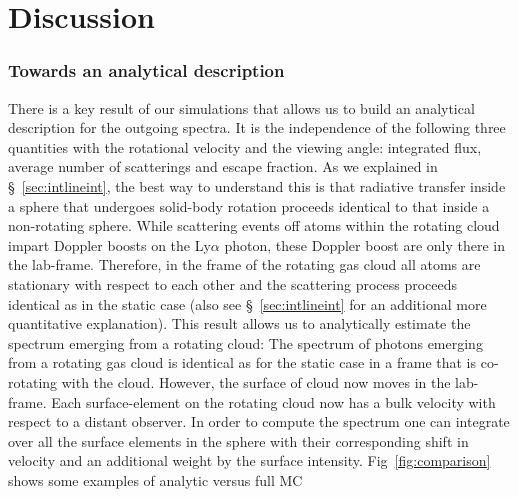 
\chapter{Discussion}

\label{sec:discussion} %



\subsection{Towards an analytical description}
There is a key result of our simulations that allows us to build an
analytical description for the outgoing spectra.
It is the independence of the following three quantities with the rotational
velocity and the viewing angle: integrated flux, average number of
scatterings and escape fraction.
As we explained in \S~\ref{sec:intlineint}, the best way to understand this is that radiative transfer inside a sphere that undergoes solid-body rotation
proceeds identical to that inside a non-rotating sphere. While scattering events off atoms within the rotating cloud impart
Doppler boosts on the Ly$\alpha$ photon, these Doppler boost are only
there in the lab-frame. Therefore, in the frame of the rotating gas cloud all atoms are
stationary with respect to each other and the scattering process
proceeds identical as in the static case (also see \S~\ref{sec:intlineint} for an additional more quantitative explanation).
This result allows us to analytically estimate the spectrum emerging from a rotating cloud:
The spectrum of \lya photons emerging from a rotating gas cloud is identical as for the static case in a frame that is co-rotating
with the cloud. However, the surface of cloud now moves in the lab-frame.
Each surface-element on the rotating cloud now has a bulk
velocity with respect to a distant observer. In order to compute the
spectrum one can integrate over all the surface elements in the
sphere with their corresponding shift in velocity and an additional
weight by the surface intensity.
Fig~\ref{fig:comparison} shows some examples of analytic versus full MC
